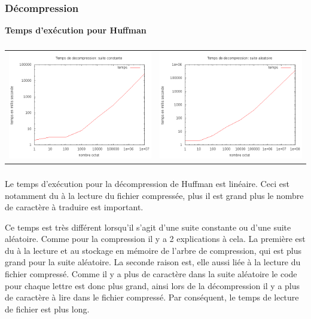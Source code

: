 \documentclass{report}
\begin{document}
\paragraph*{}
\subsubsection*{Décompression}
\textbf{Temps d’exécution pour Huffman}
\subparagraph*{}
\hspace{-2cm}\begin{tabular}{l | l}
\includegraphics[width=7cm]{tempsDhC.png} & 
\includegraphics[width=7cm]{tempsDhA.png}
\end{tabular}
\subparagraph*{}
Le temps d'exécution pour la décompression de Huffman est linéaire. Ceci est notamment du à la lecture du fichier compressée, plus il est grand plus le nombre de caractère à traduire est important. 

Ce temps est très différent lorsqu’il s'agit d'une suite constante ou d'une suite aléatoire. Comme pour la compression il y a 2 explications à cela. La première est du à la lecture et au stockage en mémoire de l'arbre de compression, qui est plus grand pour la suite aléatoire. La seconde raison est, elle aussi liée à la lecture du fichier compressé. Comme il y a plus de caractère dans la suite aléatoire le code pour chaque lettre est donc plus grand, ainsi lors de la décompression il y a plus de caractère à lire dans le fichier compressé. Par conséquent, le temps de lecture de fichier est plus long.  
\end{document}
